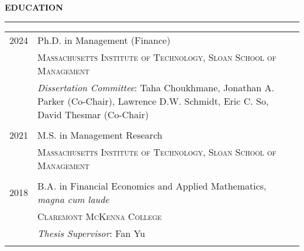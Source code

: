 \documentclass[a4paper, 10pt]{article}
\newcommand{\cvsec}[1]
{
	\needspace{2\baselineskip}
	\noindent \textbf{#1}
	
	\vspace{2pt}
	
	\hrule
	
	\bigskip
}
\newcommand{\cvitem}[2]{#1 & #2 \\ & \\}
\newenvironment{cvfree}[1]
{
	\cvsec{#1}
	}
	{
	\bigskip
}
\newenvironment{cvchrono}[1]
{
	\cvsec{#1}
	\begin{tabu} to \linewidth {X[1,l]X[6,l]} 
}
{
	\end{tabu}
}
\begin{document}
\begin{cvchrono}{EDUCATION}
	\cvitem{2024}{Ph.D. in Management (Finance) \\
		& \textsc{Massachusetts Institute of Technology, Sloan School of Management} \\
		& \emph{Dissertation Committee}: Taha Choukhmane, Jonathan A. Parker (Co-Chair), Lawrence D.W. Schmidt, Eric C. So, David Thesmar (Co-Chair)
		} 
	\cvitem{2021}{M.S. in Management Research \\
		& \textsc{Massachusetts Institute of Technology, Sloan School of Management}
		} 
	\cvitem{2018}{B.A. in Financial Economics and Applied Mathematics, \emph{magna cum laude} \\
		& \textsc{Claremont McKenna College} \\
		& \emph{Thesis Supervisor}: Fan Yu
		}
\end{cvchrono}

\end{document}
